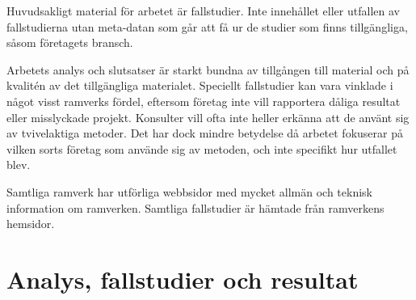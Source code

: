 		Huvudsakligt material för arbetet är fallstudier. Inte innehållet eller utfallen av fallstudierna utan meta-datan som går att få ur de studier som finns tillgängliga, såsom företagets bransch.
				
		Arbetets analys och slutsatser är starkt bundna av tillgången till material och på kvalitén av det tillgängliga materialet. Speciellt fallstudier kan vara vinklade i något visst ramverks fördel, eftersom företag inte vill rapportera dåliga resultat eller misslyckade projekt. Konsulter vill ofta inte heller erkänna att de använt sig av tvivelaktiga metoder.
		Det har dock mindre betydelse då arbetet fokuserar på vilken sorts företag som använde sig av metoden, och inte specifikt hur utfallet blev.
		
		Samtliga ramverk har utförliga webbsidor med mycket allmän och teknisk information om ramverken. Samtliga fallstudier är hämtade från ramverkens hemsidor.
		
	
	
\newpage
\section{Analys, fallstudier och resultat}
	

